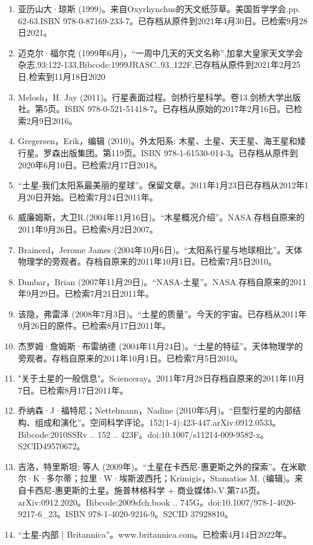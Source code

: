 \begin{enumerate}
\item 亚历山大·琼斯 (1999)。来自Oxyrhynchus的天文纸莎草。美国哲学学会.pp. 62-63.ISBN 978-0-87169-233-7。已存档从原件到2021年4月30日。已检索9月28日2021。
\item 迈克尔·福尔克 (1999年6月)，“一周中几天的天文名称”,加拿大皇家天文学会杂志,93:122-133,Bibcode:1999JRASC..93..122F,已存档从原件到2021年2月25日,检索到11月18日2020
\item Melosh，H. Jay (2011)。行星表面过程。剑桥行星科学。卷13.剑桥大学出版社。第5页。ISBN 978-0-521-51418-7。已存档从原始的2017年2月16日。已检索2月9日2016。
\item Gregersen，Erik，编辑 (2010)。外太阳系: 木星、土星、天王星、海王星和矮行星。罗森出版集团。第119页。ISBN 978-1-61530-014-3。已存档从原件到2020年6月10日。已检索2月17日2018。
\item “土星-我们太阳系最美丽的星球”。保留文章。2011年1月23日已存档从2012年1月20日开始。已检索7月24日2011年。
\item 威廉姆斯，大卫R.(2004年11月16日)。“木星概况介绍”。NASA.存档自原来的2011年9月26日。已检索8月2日2007。
\item Brainerd，Jerome James (2004年10月6日)。“太阳系行星与地球相比”。天体物理学的旁观者。存档自原来的2011年10月1日。已检索7月5日2010。
\item Dunbar，Brian (2007年11月29日)。“NASA-土星”。NASA.存档自原来的2011年9月29日。已检索7月21日2011年。
\item 该隐，弗雷泽 (2008年7月3日)。“土星的质量”。今天的宇宙。已存档从2011年9月26日的原件。已检索8月17日2011年。
\item 杰罗姆·詹姆斯·布雷纳德 (2004年11月24日)。“土星的特征”。天体物理学的旁观者。存档自原来的2011年10月1日。已检索7月5日2010。
\item "关于土星的一般信息"。Scienceray。2011年7月28日存档自原来的2011年10月7日。已检索8月17日2011年。
\item 乔纳森·J·福特尼；Nettelmann，Nadine (2010年5月)。“巨型行星的内部结构、组成和演化”。空间科学评论。152(1-4):423-447.arXiv:0912.0533。Bibcode:2010SSRv .. 152 .. 423F。doi:10.1007/s11214-009-9582-x。S2CID49570672。 
\item 吉洛，特里斯坦; 等人 (2009年)。“土星在卡西尼-惠更斯之外的探索”。在米歇尔·K·多尔蒂；拉里·W·埃斯波西托；Krimigis，Stamatios M. (编辑)。来自卡西尼-惠更斯的土星。施普林格科学 + 商业媒体b.V.第745页。arXiv:0912.2020。Bibcode:2009sfch.book .. 745G。doi:10.1007/978-1-4020-9217-6_23。ISBN 978-1-4020-9216-9。S2CID 37928810。
\item “土星-内部 | Britannica”。www.britannica.com。已检索4月14日2022年。

\end{enumerate}
